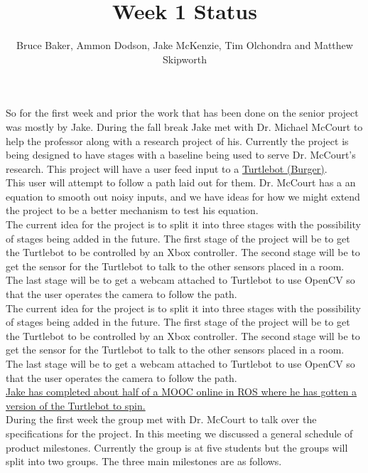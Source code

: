 \documentclass[12pt]{IEEEtran}
\begin{document}
\title{Week 1 Status}
\author{Bruce Baker, Ammon Dodson, Jake McKenzie, Tim Olchondra and Matthew Skipworth}
\maketitle

So for the first week and prior the work that has been done on the senior project 
was mostly by Jake. During the fall break Jake met with Dr. Michael McCourt to help 
the professor along with a research project of his. Currently the project is being 
designed to have stages with a baseline being used to serve Dr. McCourt’s research. 
This project will have a user feed input to a  
\href{http://wiki.ros.org/Robots/TurtleBot}{Turtlebot (Burger)}.\\

\indent This user will attempt to follow a path laid out for them.  Dr. McCourt 
has a an equation to smooth out noisy inputs, and we have ideas for how we might 
extend the project to be a better mechanism to test his equation.\\

\indent The current idea for the project is to split it into three stages with the 
possibility of stages being added in the future. The first stage of the project will 
be to get the Turtlebot to be controlled by an Xbox controller. The second stage will 
be to get the sensor for the Turtlebot to talk to the other sensors placed in a room. 
The last stage will be to get a webcam attached to Turtlebot to use OpenCV so that the 
user operates the camera to follow the path.\\

\indent The current idea for the project is to split it into three stages with the 
possibility of stages being added in the future. The first stage of the project will 
be to get the Turtlebot to be controlled by an Xbox controller. The second stage will 
be to get the sensor for the Turtlebot to talk to the other sensors placed in a room. 
The last stage will be to get a webcam attached to Turtlebot to use OpenCV so that the 
user operates the camera to follow the path. \\

\noindent \href{https://www.facebook.com/jake.mckenzie.16/videos/2450973201587222/}{
Jake has completed about half of a MOOC online in ROS where he has gotten a version 
of the Turtlebot to spin.}\\

\indent During the first week the group met with Dr. McCourt to talk over the 
specifications for the project.  In this meeting we discussed a general schedule 
of product milestones. Currently the group is at five students but the groups 
will split into two groups. The three main milestones are as follows.
\end{document}
